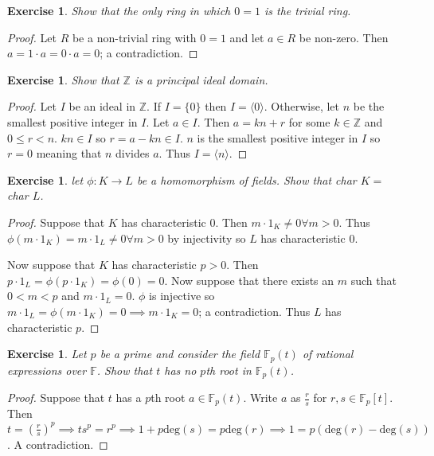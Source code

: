 \documentclass{article}
\newtheorem{exercise}[theorem]{Exercise}
\begin{document}
\begin{exercise}
Show that the only ring in which $0=1$ is the trivial ring.
\end{exercise}
\begin{proof}
Let $R$ be a non-trivial ring with $0=1$ and let $a\in R$ be non-zero. Then $a=1\cdot a=0\cdot a=0$; a contradiction.
\end{proof}

\begin{exercise}
Show that $\mathbb{Z}$ is a principal ideal domain.
\end{exercise}
\begin{proof}
Let $I$ be an ideal in $\mathbb{Z}$. If $I=\{0\}$ then $I=\langle 0\rangle $. Otherwise, let $n$ be the smallest positive integer in $I$. Let $a\in I$. Then $a=kn+r$ for some $k\in\mathbb{Z}$ and $0\leq r<n$. $kn\in I$ so $r=a-kn\in I$. $n$ is the smallest positive integer in $I$ so $r=0$ meaning that $n$ divides $a$. Thus $I=\langle n\rangle$.
\end{proof}

\begin{exercise}
let $\phi:K\to L$ be a homomorphism of fields. Show that char $K=$ char $L$.
\end{exercise}
\begin{proof}
Suppose that $K$ has characteristic $0$. Then $m\cdot 1_K\neq 0\forall m>0$. Thus $\phi(m\cdot 1_K)=m\cdot 1_L\neq0\forall m>0$ by injectivity so $L$ has characteristic $0$.

Now suppose that $K$ has characteristic $p>0$. Then $p\cdot 1_L=\phi(p\cdot 1_K)=\phi(0)=0$. Now suppose that there exists an $m$ such that $0<m<p$ and $m\cdot 1_L=0$. $\phi$ is injective so $m\cdot 1_L=\phi(m\cdot 1_K)=0\implies m\cdot 1_K=0$; a contradiction. Thus $L$ has characteristic $p$.
\end{proof}

\begin{exercise}
Let $p$ be a prime and consider the field $\mathbb{F}_p(t)$ of rational expressions over $\mathbb{F}$. Show that $t$ has no $p$th root in $\mathbb{F}_p(t)$.
\end{exercise}

\begin{proof}
Suppose that $t$ has a $p$th root $a\in \mathbb{F}_p(t)$. Write $a$ as $\frac{r}{s}$ for $r,s\in\mathbb{F}_p[t]$. Then $t=(\frac{r}{s})^p\implies ts^p=r^p\implies 1+p\text{deg}(s)=p\text{deg}(r)\implies 1=p(\text{deg}(r)-\text{deg}(s))$. A contradiction.
\end{proof}
\end{document}
